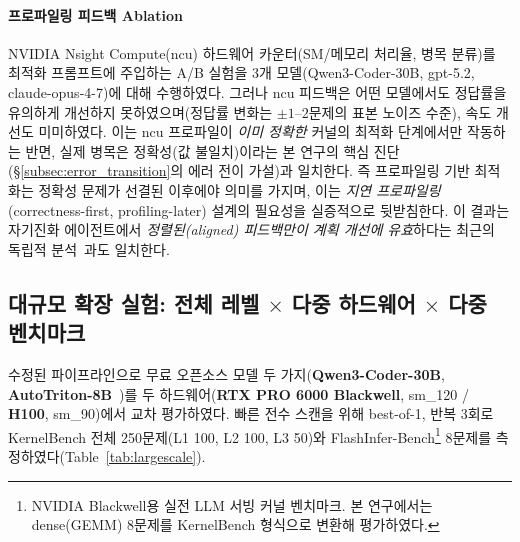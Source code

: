 \documentclass[sigplan,screen,review,anonymous]{acmart}
\begin{document}
\paragraph{프로파일링 피드백 Ablation}
NVIDIA Nsight Compute(ncu) 하드웨어 카운터(SM/메모리 처리율, 병목 분류)를 최적화 프롬프트에 주입하는 A/B 실험을 3개 모델(Qwen3-Coder-30B, gpt-5.2, claude-opus-4-7)에 대해 수행하였다. 그러나 ncu 피드백은 어떤 모델에서도 정답률을 유의하게 개선하지 못하였으며(정답률 변화는 $\pm1$--$2$문제의 표본 노이즈 수준), 속도 개선도 미미하였다. 이는 ncu 프로파일이 \emph{이미 정확한} 커널의 최적화 단계에서만 작동하는 반면, 실제 병목은 정확성(값 불일치)이라는 본 연구의 핵심 진단(\S\ref{subsec:error_transition}의 에러 전이 가설)과 일치한다. 즉 프로파일링 기반 최적화는 정확성 문제가 선결된 이후에야 의미를 가지며, 이는 \emph{지연 프로파일링}(correctness-first, profiling-later) 설계의 필요성을 실증적으로 뒷받침한다. 이 결과는 자기진화 에이전트에서 \emph{정렬된(aligned) 피드백만이 계획 개선에 유효}하다는 최근의 독립적 분석~\cite{chong2026feedback2plan}과도 일치한다.

\subsection{대규모 확장 실험: 전체 레벨 $\times$ 다중 하드웨어 $\times$ 다중 벤치마크}
\label{subsec:large_scale}

수정된 파이프라인으로 무료 오픈소스 모델 두 가지(\textbf{Qwen3-Coder-30B}, \textbf{AutoTriton-8B}~\cite{li2025autotriton})를 두 하드웨어(\textbf{RTX PRO 6000 Blackwell}, sm\_120 / \textbf{H100}, sm\_90)에서 교차 평가하였다. 빠른 전수 스캔을 위해 best-of-1, 반복 3회로 KernelBench 전체 250문제(L1 100, L2 100, L3 50)와 FlashInfer-Bench\footnote{NVIDIA Blackwell용 실전 LLM 서빙 커널 벤치마크. 본 연구에서는 dense(GEMM) 8문제를 KernelBench 형식으로 변환해 평가하였다.} 8문제를 측정하였다(Table~\ref{tab:largescale}).

\begin{table}[t]
\centering
\caption{전체 레벨 정답률(Fast-0), best-of-1·반복 3. AT=AutoTriton-8B. BW=Blackwell sm\_120, H100=sm\_90, A6000=Ampere. H100/A6000 AT 열은 2026-06 전체 스위트 재실행 결과이며, best-of-1 특성상 절대값은 실행 간 편차가 있으나 모델·하드웨어 간 정성적 순서는 유지된다($^{\ddagger}$).}
\label{tab:largescale}
\end{table}
\end{document}
